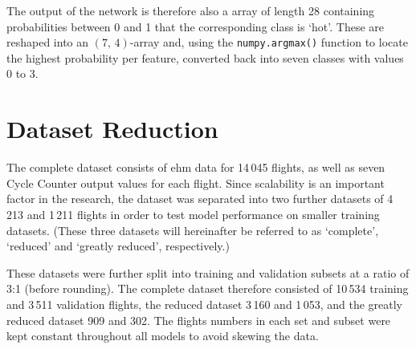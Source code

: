 The output of the network is therefore also a array of length 28 containing probabilities between 0 and 1 that the corresponding class is `hot'. These are reshaped into an \(\left(7,\,4\right)\)-array and, using the \texttt{numpy.argmax()} function to locate the highest probability per feature, converted back into seven classes with values 0 to 3.

\section{Dataset Reduction} \label{sec:data_sizes}
The complete dataset consists of \ac{ehm} data for 14\,045 flights, as well as seven Cycle Counter output values for each flight. Since scalability is an important factor in the research, the dataset was separated into two further datasets of 4\,213 and 1\,211 flights in order to test model performance on smaller training datasets. (These three datasets will hereinafter be referred to as `complete', `reduced' and `greatly reduced', respectively.)

These datasets were further split into training and validation subsets at a ratio of 3:1 (before rounding). The complete dataset therefore consisted of 10\,534 training and 3\,511 validation flights, the reduced dataset 3\,160 and 1\,053, and the greatly reduced dataset 909 and 302. The flights numbers in each set and subset were kept constant throughout all models to avoid skewing the data.



